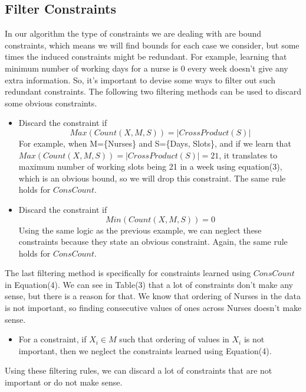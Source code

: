 \documentclass{article}
\begin{document}
\subsection{Filter Constraints}
In our algorithm the type of constraints we are dealing with are bound constraints, which means we will find bounds for each case we consider, but some times the induced constraints might be redundant. For example, learning that minimum number of working days for a nurse is 0 every week doesn't give any extra information. So, it's important to devise some ways to filter out such redundant constraints. The following two filtering methods can be used to discard some obvious constraints.
\begin{itemize}
\item Discard the constraint if 
\[
Max(Count(X,M,S)) = |CrossProduct(S)|
\]
For example, when M=\{Nurses\} and S=\{Days, Slots\}, and if we learn that $Max(Count(X,M,S)) = |CrossProduct(S)| = 21$, it translates to maximum number of working slots being 21 in a week using equation(3), which is an obvious bound, so we will drop this constraint. The same rule holds for $ConsCount$.
\item Discard the constraint if  
\[
Min(Count(X,M,S)) = 0
\]
Using the same logic as the previous example, we can neglect these constraints because they state an obvious constraint. Again, the same rule holds for $ConsCount$.
\end{itemize}
The last filtering method is specifically for constraints learned using $ConsCount$ in Equation(4). We can see in Table(3) that a lot of constraints don't make any sense, but there is a reason for that. We know that ordering of Nurses in the data is not important, so finding consecutive values of ones across Nurses doesn't make sense.
\begin{itemize}
\item For a constraint, if $X_i \in M$ such that ordering of values in $X_i$ is not important, then we neglect the constraints learned using Equation(4).
\end{itemize}

Using these filtering rules, we can discard a lot of constraints that are not important or do not make sense.
\end{document}
